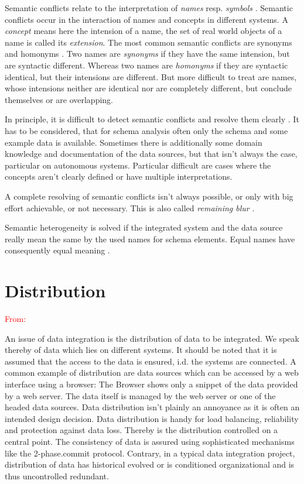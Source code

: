 Semantic conflicts relate to the interpretation of \emph{names} resp. \emph{symbols} \cite[p. 74]{DBLP:books/dp/LeserN2006}. 
Semantic conflicts occur in the interaction of names and concepts in different systems. A \textit{concept} means here the intension of a name, the set of real world objects of a name is called its \emph{extension}. 
The most common semantic conflicts are synonyms and homonyms \cite[p. 75]{DBLP:books/dp/LeserN2006}. 
Two names are \textit{synonyms} if they have the same intension, but are syntactic different. 
Whereas two names are \textit{homonyms} if they are syntactic identical, but their intensions are different. But more difficult to treat are names, whose intensions neither are identical nor are completely different, but conclude themselves or are overlapping.

In principle, it is difficult to detect semantic conflicts and resolve them clearly \cite[p. 76]{DBLP:books/dp/LeserN2006}. 
It has to be considered, that for schema analysis often only the schema and some example data is available. Sometimes there is additionally some domain knowledge and documentation of the data sources, but that isn't always the case, particular on autonomous systems. Particular difficult are cases where the concepts aren't clearly defined or have multiple interpretations. 

A complete resolving of semantic conflicts isn't always possible, or only with big effort achievable, or not necessary. This is also called \textit{remaining blur} \cite[p. 76]{DBLP:books/dp/LeserN2006}.

Semantic heterogeneity is solved if the integrated system and the data source really mean the same by the used names for schema elements. Equal names have consequently equal meaning \cite[p. 61]{DBLP:books/dp/LeserN2006}.

\section{Distribution}
\textcolor{red}{From: \cite[chapter 3.1 (p.51-54)]{DBLP:books/dp/LeserN2006}}

An issue of data integration is the distribution of data to be integrated. We speak thereby of data which lies on different systems. It should be noted that it is assumed that the access to the data is ensured, i.d. the systems are connected. A common example of distribution are data sources which can be accessed by a web interface using a browser: The Browser shows only a snippet of the data provided by a web server. The data itself is managed by the web server or one of the headed data sources. 
Data distribution isn't plainly an annoyance as it is often an intended design decision. Data distribution is handy for load balancing, reliability and protection against data loss. Thereby is the distribution controlled on a central point. The consistency of data is assured using sophisticated mechanisms like the 2-phase.commit protocol. Contrary, in a typical data integration project, distribution of data has historical evolved or is conditioned organizational and is thus uncontrolled redundant.

